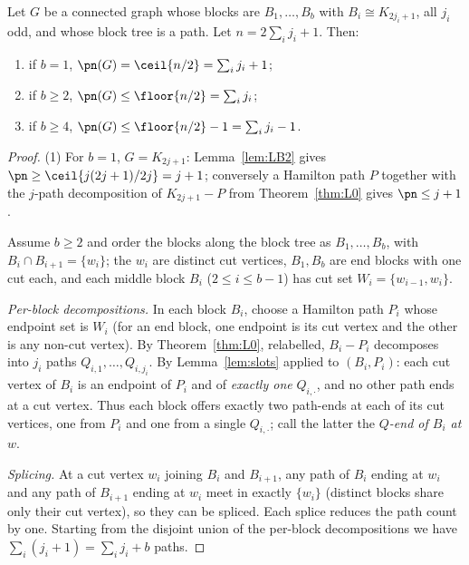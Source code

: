 \begin{theorem}\label{thm:chain}
Let $G$ be a connected graph whose blocks are $B_1,\dots,B_b$ with $B_i\cong K_{2j_i+1}$,
all $j_i$ odd, and whose block tree is a path. Let $n=2\sum_ij_i+1$. Then:
\begin{enumerate}[label={\rm(\roman*)},leftmargin=2em]
\item if $b=1$, $\pn(G)=\ceil{n/2}=\sum_ij_i+1$;
\item if $b\ge2$, $\pn(G)\le\floor{n/2}=\sum_ij_i$;
\item if $b\ge4$, $\pn(G)\le\floor{n/2}-1=\sum_ij_i-1$.
\end{enumerate}
\end{theorem}

\begin{proof}
(1) For $b=1$, $G=K_{2j+1}$: Lemma~\ref{lem:LB2} gives
$\pn\ge\ceil{j(2j+1)/2j}=j+1$; conversely a Hamilton path $P$ together with the $j$-path
decomposition of $K_{2j+1}-P$ from Theorem~\ref{thm:L0} gives $\pn\le j+1$.

Assume $b\ge2$ and order the blocks along the block tree as $B_1,\dots,B_b$, with
$B_i\cap B_{i+1}=\{w_i\}$; the $w_i$ are distinct cut vertices, $B_1,B_b$ are end blocks with
one cut each, and each middle block $B_i$ ($2\le i\le b-1$) has cut set
$W_i=\{w_{i-1},w_i\}$.

\emph{Per-block decompositions.} In each block $B_i$, choose a Hamilton path $P_i$ whose
endpoint set is $W_i$ (for an end block, one endpoint is its cut vertex and the other is any
non-cut vertex). By Theorem~\ref{thm:L0}, relabelled, $B_i-P_i$ decomposes into $j_i$ paths
$Q_{i,1},\dots,Q_{i,j_i}$. By Lemma~\ref{lem:slots} applied to $(B_i,P_i)$: each cut vertex of
$B_i$ is an endpoint of $P_i$ and of \emph{exactly one} $Q_{i,\cdot}$, and no other path ends
at a cut vertex. Thus each block offers exactly two path-ends at each of its cut vertices,
one from $P_i$ and one from a single $Q_{i,\cdot}$; call the latter the \emph{$Q$-end of $B_i$
at $w$}.

\emph{Splicing.} At a cut vertex $w_i$ joining $B_i$ and $B_{i+1}$, any path of $B_i$ ending
at $w_i$ and any path of $B_{i+1}$ ending at $w_i$ meet in exactly $\{w_i\}$ (distinct blocks
share only their cut vertex), so they can be spliced. Each splice reduces the path count by
one. Starting from the disjoint union of the per-block decompositions we have
$\sum_i(j_i+1)=\sum_ij_i+b$ paths.


\end{proof}
